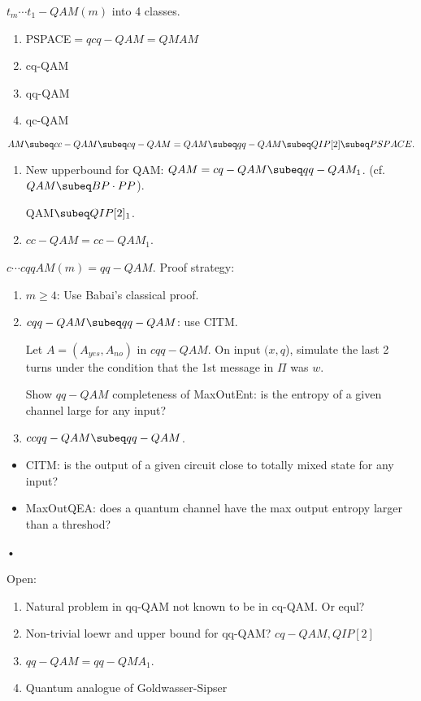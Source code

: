 $t_m\cdots t_1-QAM(m)$ into 4 classes.
\begin{enumerate}
\item
PSPACE$=qcq-QAM=QMAM$
\item
cq-QAM
\item 
qq-QAM
\item 
qc-QAM
\end{enumerate}
\[
AM\subeq cc-QAM\subeq cq-QAM=QAM\subeq qq-QAM\subeq QIP[2]\subeq PSPACE.
\]

\begin{enumerate}
\item
New upperbound for QAM: $QAM=cq-QAM\subeq qq-QAM_1$. (cf. $QAM\subeq BP\cdot PP$).

QAM$\subeq QIP[2]_1$.
\item
$cc-QAM=cc-QAM_1$.
\end{enumerate}

$c\cdots cqqAM(m)=qq-QAM.$
Proof strategy:
\begin{enumerate}
\item
$m\ge 4$: Use Babai's classical proof.
\item
$cqq-QAM\subeq qq-QAM$: use CITM.

Let $A=(A_{yes},A_{no})$ in $cqq-QAM$. On input $(x,q$), simulate the last 2 turns under the condition that the 1st message in $\Pi$ was $w$.

Show $qq-QAM$ completeness of MaxOutEnt: is the entropy of a  given channel large for any input?
\item
$ccqq-QAM\subeq qq-QAM$.
\end{enumerate}

\begin{itemize}
\item
CITM: is the output of a given circuit close to totally mixed state for any input?
\item
MaxOutQEA: does a quantum channel have the max output entropy larger than a threshod?
\end{itemize}•

Open:
\begin{enumerate}
\item
Natural problem in qq-QAM not known to be in cq-QAM. Or equl?
\item
Non-trivial loewr and upper bound for qq-QAM? $cq-QAM, QIP[2]$
\item
$qq-QAM=qq-QMA_1$.
\item Quantum analogue of Goldwasser-Sipser
\end{enumerate}
